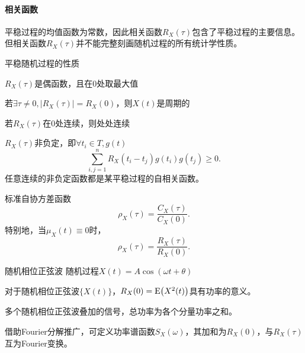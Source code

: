 \paragraph{相关函数}
平稳过程的均值函数为常数，因此相关函数$R_X(\tau)$包含了平稳过程的主要信息。但相关函数$R_X(\tau)$并不能完整刻画随机过程的所有统计学性质。
\begin{theorem}{平稳随机过程的性质}{}
	\begin{compactitem}
		\item $R_X(\tau)$是偶函数，且在0处取最大值
		\item 若$\exists\tau\neq 0,|R_X(\tau)|=R_X(0)$，则$X(t)$是周期的
		\item 若$R_X(\tau)$在0处连续，则处处连续
		\item $R_X(\tau)$非负定，即$\forall t_i\in T,g(t)$
		\[
			\sum_{i,j=1}^nR_X(t_i-t_j)g(t_i)g(t_j)\geqslant 0.
		\]
		任意连续的非负定函数都是某平稳过程的自相关函数。
	\end{compactitem}
\end{theorem}
标准自协方差函数
\[
	\rho_X(\tau)=\frac{C_X(\tau)}{C_X(0)}.
\]
特别地，当$\mu_X(t)\equiv 0$时，
\[
	\rho_X(\tau)=\frac{R_X(\tau)}{R_X(0)}.
\]
\begin{example}{随机相位正弦波}{}
	随机过程$X(t)=A\cos(\omega t+\theta)$
\end{example}
对于随机相位正弦波$\{X(t)\}$，$R_X(0)=\operatorname{E}\bigl(X^2(t)\bigr)$具有功率的意义。
\begin{compactitem}
	\item 多个随机相位正弦波叠加的信号，总功率为各个分量功率之和。
	\item 借助Fourier分解推广，可定义功率谱函数$S_X(\omega)$，其加和为$R_X(0)$，与$R_X(\tau)$互为Fourier变换。
\end{compactitem}

